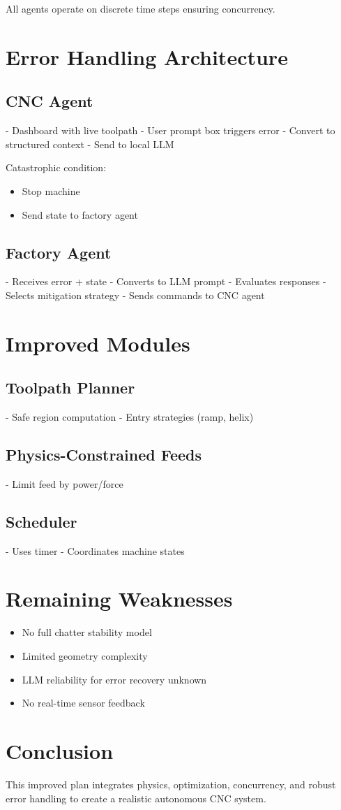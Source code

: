 \documentclass{article}
\begin{document}
All agents operate on discrete time steps ensuring concurrency.

\section{Error Handling Architecture}

\subsection{CNC Agent}
- Dashboard with live toolpath
- User prompt box triggers error
- Convert to structured context
- Send to local LLM

Catastrophic condition:
\begin{itemize}
\item Stop machine
\item Send state to factory agent
\end{itemize}

\subsection{Factory Agent}
- Receives error + state
- Converts to LLM prompt
- Evaluates responses
- Selects mitigation strategy
- Sends commands to CNC agent

\section{Improved Modules}

\subsection{Toolpath Planner}
- Safe region computation
- Entry strategies (ramp, helix)

\subsection{Physics-Constrained Feeds}
- Limit feed by power/force

\subsection{Scheduler}
- Uses timer
- Coordinates machine states

\section{Remaining Weaknesses}
\begin{itemize}
\item No full chatter stability model
\item Limited geometry complexity
\item LLM reliability for error recovery unknown
\item No real-time sensor feedback
\end{itemize}

\section{Conclusion}
This improved plan integrates physics, optimization, concurrency, and robust error handling to create a realistic autonomous CNC system.
\end{document}
